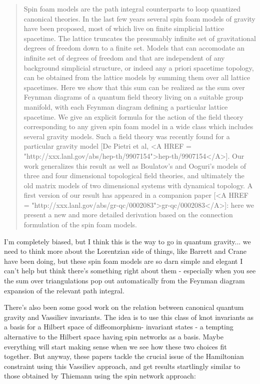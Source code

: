 \begin{quote}
     Spin foam models are the path integral counterparts to loop
     quantized canonical theories. In the last few years several spin
     foam models of gravity have been proposed, most of which live on
     finite simplicial lattice spacetime. The lattice truncates the
     presumably infinite set of gravitational degrees of freedom down to
     a finite set. Models that can accomodate an infinite set of degrees
     of freedom and that are independent of any background simplicial
     structure, or indeed any a priori spacetime topology, can be
     obtained from the lattice models by summing them over all lattice
     spacetimes. Here we show that this sum can be realized as the sum
     over Feynman diagrams of a quantum field theory living on a
     suitable group manifold, with each Feynman diagram defining a
     particular lattice spacetime. We give an explicit formula for the
     action of the field theory corresponding to any given spin foam
     model in a wide class which includes several gravity models. Such a
     field theory was recently found for a particular gravity model [De
     Pietri et al, <A HREF = "http://xxx.lanl.gov/abs/hep-th/9907154">hep-th/9907154</A>]. Our work generalizes this result as
     well as Boulatov's and Ooguri's models of three and four
     dimensional topological field theories, and ultimately the old
     matrix models of two dimensional systems with dynamical topology. A
     first version of our result has appeared in a companion paper
     [<A HREF = "http://xxx.lanl.gov/abs/gr-qc/0002083">gr-qc/0002083</A>]: here we present a new and more detailed derivation
     based on the connection formulation of the spin foam models.
\end{quote}
    

I'm completely biased, but I think this is the way to go in quantum
gravity... we need to think more about the Lorentzian side of things,
like Barrett and Crane have been doing, but these spin foam models are
so darn simple and elegant I can't help but think there's something
right about them - especially when you see the sum over triangulations
pop out automatically from the Feynman diagram expansion of the relevant
path integral.

There's also been some good work on the relation between canonical
quantum gravity and Vassiliev invariants.  The idea is to use this class
of knot invariants as a basis for a Hilbert space of diffeomorphism-
invariant states - a tempting alternative to the Hilbert space having
spin networks as a basis.  Maybe everything will start making sense 
when we see how these two choices fit together.  But anyway, these
papers tackle the crucial issue of the Hamiltonian constraint using
this Vassiliev approach, and get results startlingly similar to those
obtained by Thiemann using the spin network approach:

